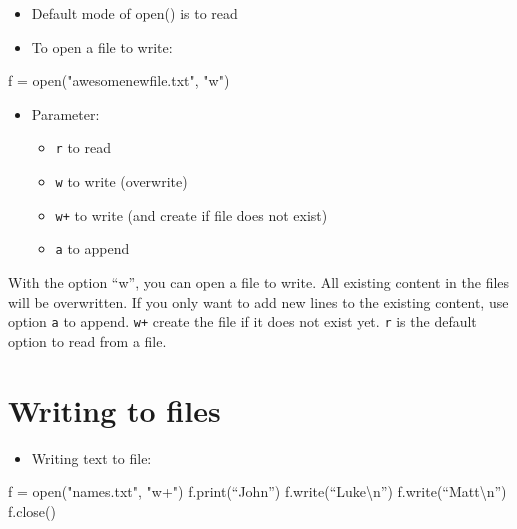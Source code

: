 \documentclass[
  letterpaper,
]{scrbook}
\newenvironment{Shaded}{\begin{snugshade}}{\end{snugshade}}
\newcommand{\BuiltInTok}[1]{\textcolor[rgb]{0.00,0.23,0.31}{#1}}
\newcommand{\NormalTok}[1]{\textcolor[rgb]{0.00,0.23,0.31}{#1}}
\newcommand{\OperatorTok}[1]{\textcolor[rgb]{0.37,0.37,0.37}{#1}}
\newcommand{\StringTok}[1]{\textcolor[rgb]{0.13,0.47,0.30}{#1}}
\providecommand{\tightlist}{%
  \setlength{\itemsep}{0pt}\setlength{\parskip}{0pt}}
\begin{document}

\begin{itemize}
\tightlist
\item
  Default mode of open() is to read
\item
  To open a file to write:
\end{itemize}

\begin{Shaded}
\begin{Highlighting}[]
\NormalTok{f }\OperatorTok{=} \BuiltInTok{open}\NormalTok{(}\StringTok{"awesomenewfile.txt"}\NormalTok{, }\StringTok{"w"}\NormalTok{)}
\end{Highlighting}
\end{Shaded}

\begin{itemize}
\tightlist
\item
  Parameter:

  \begin{itemize}
  \tightlist
  \item
    \texttt{r} to read
  \item
    \texttt{w} to write (overwrite)
  \item
    \texttt{w+} to write (and create if file does not exist)
  \item
    \texttt{a} to append
  \end{itemize}
\end{itemize}

With the option ``w'', you can open a file to write. All existing
content in the files will be overwritten. If you only want to add new
lines to the existing content, use option \texttt{a} to append.
\texttt{w+} create the file if it does not exist yet. \texttt{r} is the
default option to read from a file.

\section*{Writing to files}\label{writing-to-files-1}


\begin{itemize}
\tightlist
\item
  Writing text to file:
\end{itemize}

\begin{Shaded}
\begin{Highlighting}[]
\NormalTok{f }\OperatorTok{=} \BuiltInTok{open}\NormalTok{(}\StringTok{"names.txt"}\NormalTok{, }\StringTok{"w+"}\NormalTok{)}
\NormalTok{f.}\BuiltInTok{print}\NormalTok{(“John”)}
\NormalTok{f.write(“Luke\textbackslash{}n”)}
\NormalTok{f.write(“Matt\textbackslash{}n”)}
\NormalTok{f.close()}
\end{Highlighting}
\end{Shaded}
\end{document}
